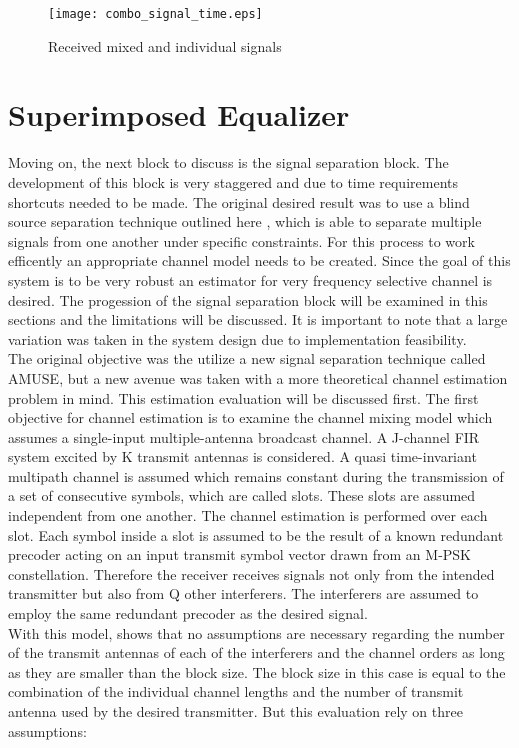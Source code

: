\begin{figure}[!ht]\label{combo_signal_time}
\centering
\texttt{[image: combo\_signal\_time.eps]}
\caption{Received mixed and individual signals}
\end{figure}

\section{Superimposed Equalizer}

Moving on, the next block to discuss is the signal separation block.  The development of this block is very staggered and due to time requirements shortcuts needed to be made.  The original desired result was to use a blind source separation technique outlined here \cite{AMUSE}, which is able to separate multiple signals from one another under specific constraints.  For this process to work efficently an appropriate channel model needs to be created.  Since the goal of this system is to be very robust an estimator for very frequency selective channel is desired.  The progession of the signal separation block will be examined in this sections and the limitations will be discussed.  It is important to note that a large variation was taken in the system design due to implementation feasibility.\\

The original objective was the utilize a new signal separation technique called AMUSE, but a new avenue was taken with a more theoretical channel estimation problem in mind.  This estimation evaluation will be discussed first.  The first objective for channel estimation is to examine the channel mixing model which assumes a single-input multiple-antenna broadcast channel.  A J-channel FIR system excited by K transmit antennas is considered. A quasi time-invariant multipath channel is assumed which remains constant during the transmission of a set of consecutive symbols, which are called slots. These slots are assumed independent from one another.  The channel estimation is performed over each slot. Each symbol inside a slot is assumed to be the result of a known redundant precoder acting on an input transmit symbol vector drawn from an M-PSK constellation. Therefore the receiver receives signals not only from the intended transmitter but also from Q other interferers. The interferers are assumed to employ the same redundant precoder as the desired signal\cite{skrkantPHD}.\\

With this model, \cite{midterm_report} shows that no assumptions are necessary regarding the number of the transmit antennas of each of the interferers and the channel orders as long as they are smaller than the block size.  The block size in this case is equal to the combination of the individual channel lengths and the number of transmit antenna used by the desired transmitter.  But this evaluation rely on three assumptions:

